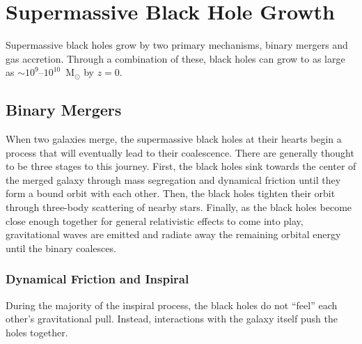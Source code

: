 
\section{Supermassive Black Hole Growth}
\label{sec:smbh_growth}

Supermassive black holes grow by two primary mechanisms, binary mergers and gas accretion.  Through a combination of these, black holes can grow to as large as $\sim 10^{9}$--$10^{10}$~M$_{\odot}$ by $z = 0$.



\subsection{Binary Mergers}

When two galaxies merge, the supermassive black holes at their hearts begin a process that will eventually lead to their coalescence.  There are generally thought to be three stages to this journey.  First, the black holes sink towards the center of the merged galaxy through mass segregation and dynamical friction until they form a bound orbit with each other.  Then, the black holes tighten their orbit through three-body scattering of nearby stars.  Finally, as the black holes become close enough together for general relativistic effects to come into play, gravitational waves are emitted and radiate away the remaining orbital energy until the binary coalesces.


\subsubsection{Dynamical Friction and Inspiral}

During the majority of the inspiral process, the black holes do not ``feel'' each other's gravitational pull.  Instead, interactions with the galaxy itself push the holes together.

